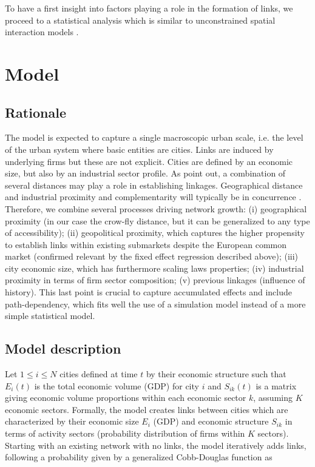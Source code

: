 \documentclass[11pt]{article}
\begin{document}
To have a first insight into factors playing a role in the formation of links, we proceed to a statistical analysis which is similar to unconstrained spatial interaction models \cite{wilson1975some}.



\section{Model}

\subsection{Rationale}

The model is expected to capture a single macroscopic urban scale, i.e. the level of the urban system where basic entities are cities. Links are induced by underlying firms but these are not explicit. Cities are defined by an economic size, but also by an industrial sector profile. As \citep{martinus2018global} point out, a combination of several distances may play a role in establishing linkages. Geographical distance and industrial proximity and complementarity will typically be in concurrence \cite{cottineau2020nested}. Therefore, we combine several processes driving network growth: (i) geographical proximity (in our case the crow-fly distance, but it can be generalized to any type of accessibility); (ii) geopolitical proximity, which captures the higher propensity to establish links within existing submarkets despite the European common market (confirmed relevant by the fixed effect regression described above); (iii) city economic size, which has furthermore scaling laws properties; (iv) industrial proximity in terms of firm sector composition; (v) previous linkages (influence of history). This last point is crucial to capture accumulated effects and include path-dependency, which fits well the use of a simulation model instead of a more simple statistical model.



\subsection{Model description}

Let $1 \leq i \leq N$ cities defined at time $t$ by their economic structure such that $E_i(t)$ is the total economic volume (GDP) for city $i$ and $S_{ik}(t)$ is a matrix giving economic volume proportions within each economic sector $k$, assuming $K$ economic sectors. Formally, the model creates links between cities which are characterized by their economic size $E_i$ (GDP) and economic structure $S_{ik}$ in terms of activity sectors (probability distribution of firms within $K$ sectors). Starting with an existing network with no links, the model iteratively adds links, following a probability given by a generalized Cobb-Douglas function \cite{vilcu2011geometric} as 
\end{document}
